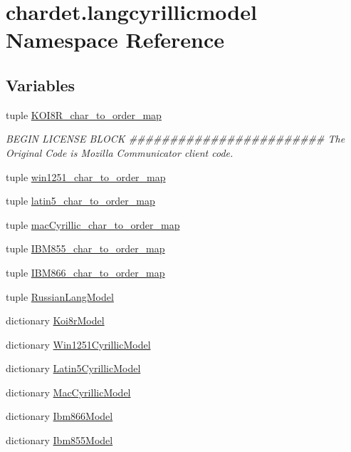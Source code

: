 \hypertarget{namespacechardet_1_1langcyrillicmodel}{}\section{chardet.\+langcyrillicmodel Namespace Reference}
\label{namespacechardet_1_1langcyrillicmodel}
\subsection*{Variables}
\begin{DoxyCompactItemize}
\item 
tuple \hyperlink{namespacechardet_1_1langcyrillicmodel_aa36c157da5b2c3c2dcb068a709cbb036}{K\+O\+I8\+R\+\_\+char\+\_\+to\+\_\+order\+\_\+map}
\begin{DoxyCompactList}\small\item\em B\+E\+G\+IN L\+I\+C\+E\+N\+SE B\+L\+O\+CK \#\#\#\#\#\#\#\#\#\#\#\#\#\#\#\#\#\#\#\#\#\#\#\# The Original Code is Mozilla Communicator client code. \end{DoxyCompactList}\item 
tuple \hyperlink{namespacechardet_1_1langcyrillicmodel_a11177f32efae9860304207fbad8c9243}{win1251\+\_\+char\+\_\+to\+\_\+order\+\_\+map}
\item 
tuple \hyperlink{namespacechardet_1_1langcyrillicmodel_a52f0e6de294d8c0e7ee292628c54d48f}{latin5\+\_\+char\+\_\+to\+\_\+order\+\_\+map}
\item 
tuple \hyperlink{namespacechardet_1_1langcyrillicmodel_a80de65a878a19cc925725146f78b2439}{mac\+Cyrillic\+\_\+char\+\_\+to\+\_\+order\+\_\+map}
\item 
tuple \hyperlink{namespacechardet_1_1langcyrillicmodel_aa44af53230a94d758b77d7cd94ec3a6d}{I\+B\+M855\+\_\+char\+\_\+to\+\_\+order\+\_\+map}
\item 
tuple \hyperlink{namespacechardet_1_1langcyrillicmodel_a8f8bad549aa0813f548b1dbf50c947ea}{I\+B\+M866\+\_\+char\+\_\+to\+\_\+order\+\_\+map}
\item 
tuple \hyperlink{namespacechardet_1_1langcyrillicmodel_ab72832d91cf9cb099e76fd3ea13d2dc6}{Russian\+Lang\+Model}
\item 
dictionary \hyperlink{namespacechardet_1_1langcyrillicmodel_a390e68c980ff81c55d94028e25ea1054}{Koi8r\+Model}
\item 
dictionary \hyperlink{namespacechardet_1_1langcyrillicmodel_a83596b8b4e5d1a7bca55cef8ed9538c9}{Win1251\+Cyrillic\+Model}
\item 
dictionary \hyperlink{namespacechardet_1_1langcyrillicmodel_a25f9ccb877512c68f92108d47bbf1894}{Latin5\+Cyrillic\+Model}
\item 
dictionary \hyperlink{namespacechardet_1_1langcyrillicmodel_ab223264a9ea93673d09a09421bda429d}{Mac\+Cyrillic\+Model}
\item 
dictionary \hyperlink{namespacechardet_1_1langcyrillicmodel_ae6178fd2e56f6b18c6a77ac554a73842}{Ibm866\+Model}
\item 
dictionary \hyperlink{namespacechardet_1_1langcyrillicmodel_aa82f8d589a1f112aea5415a75d0e2a8b}{Ibm855\+Model}
\end{DoxyCompactItemize}


